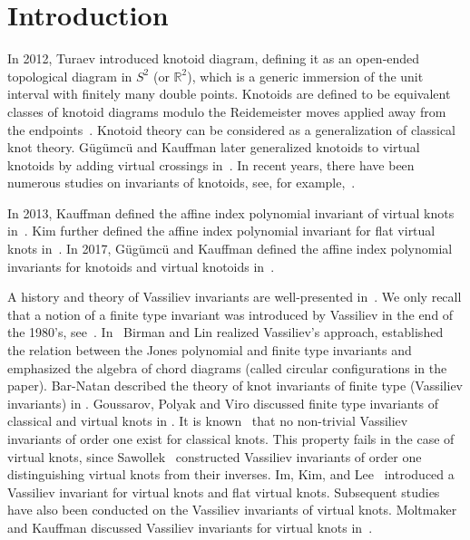 \documentclass[11pt]{amsart}
\theoremstyle{noparens}
\numberwithin{equation}{section}
\numberwithin{equation}{section}
\begin{document}
\maketitle


\section{Introduction}
In 2012, Turaev introduced knotoid diagram, defining it as an open-ended topological diagram in $S^2$ (or $\mathbb{R}^2$), which is a generic immersion of the unit interval with finitely many double points. Knotoids are defined to be equivalent classes of knotoid diagrams modulo the Reidemeister moves applied away from the endpoints~\cite{Tur1}.  Knotoid theory can be considered as a generalization of classical knot theory. G\"{u}g\"{u}mc\"{u} and Kauffman later generalized knotoids to virtual knotoids by adding virtual crossings in~\cite{GK}. In recent years, there have been numerous studies on invariants of knotoids, see, for example,~\cite{Tar,FLV}.

In 2013, Kauffman defined the affine index polynomial invariant of virtual knots in~\cite{Kau}. Kim further defined the affine index polynomial invariant for flat virtual knots in~\cite{Kim}.  In 2017, G\"{u}g\"{u}mc\"{u} and Kauffman defined the affine index polynomial invariants for knotoids and virtual knotoids in~\cite{GK}.

A history and theory of Vassiliev invariants are well-presented in~\cite{CDM}. We only recall that  a notion of a finite type invariant was introduced by Vassiliev in the end of the 1980's, see~\cite{Vas1, Vas2}. In~\cite{BL} Birman and Lin realized Vassiliev's approach, established the relation between the Jones polynomial and finite type invariants and emphasized the algebra of chord diagrams (called circular configurations in the paper).  Bar-Natan described the theory of knot invariants of finite type (Vassiliev invariants) in \cite{BN}. Goussarov, Polyak and Viro discussed finite type invariants of classical and virtual knots in \cite{GPV}. It is known~\cite[Ch~3.3]{CDM} that no non-trivial Vassiliev invariants of order one exist for classical knots. This property fails in the case of virtual knots, since Sawollek~\cite{Saw} constructed Vassiliev invariants of order one distinguishing virtual knots from their inverses. Im, Kim, and Lee~\cite{IKL} introduced a Vassiliev invariant for virtual knots and flat virtual knots. Subsequent studies have also been conducted on the Vassiliev invariants of virtual knots. Moltmaker and Kauffman discussed Vassiliev invariants for virtual knots in~\cite{MK}. 
\end{document}
